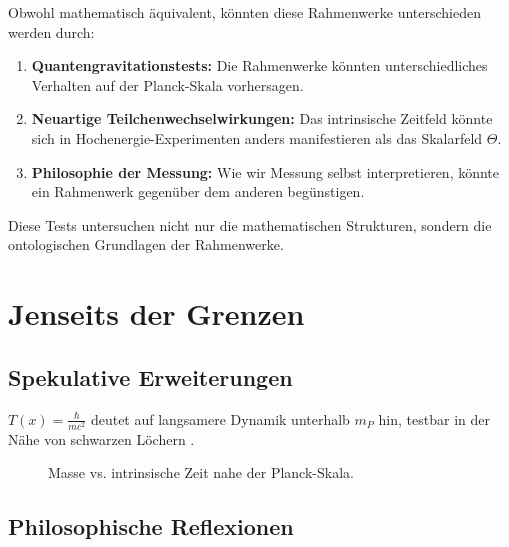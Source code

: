 \documentclass[twocolumn,aps,prl]{revtex4-2}
\newcommand{\Tfield}{T(x)}
\begin{document}
	Obwohl mathematisch äquivalent, könnten diese Rahmenwerke unterschieden werden durch:
	
	\begin{enumerate}
		\item \textbf{Quantengravitationstests:} Die Rahmenwerke könnten unterschiedliches Verhalten auf der Planck-Skala vorhersagen.
		\item \textbf{Neuartige Teilchenwechselwirkungen:} Das intrinsische Zeitfeld könnte sich in Hochenergie-Experimenten anders manifestieren als das Skalarfeld \(\Theta\).
		\item \textbf{Philosophie der Messung:} Wie wir Messung selbst interpretieren, könnte ein Rahmenwerk gegenüber dem anderen begünstigen.
	\end{enumerate}
	
	Diese Tests untersuchen nicht nur die mathematischen Strukturen, sondern die ontologischen Grundlagen der Rahmenwerke.
	
	\section{Jenseits der Grenzen}
	\label{sec:beyond_limits}
	
	\subsection{Spekulative Erweiterungen}
	\label{subsec:speculative_extensions}
	
	\(\Tfield = \frac{\hbar}{m c^2}\) deutet auf langsamere Dynamik unterhalb \(m_P\) hin, testbar in der Nähe von schwarzen Löchern \cite{pascher_planck_2025}.
	
	\begin{figure}[ht]
		\centering
		\caption{Masse vs. intrinsische Zeit nahe der Planck-Skala.}
		\label{fig:mass_time}
	\end{figure}
	
	\subsection{Philosophische Reflexionen}
	\label{subsec:philosophical_reflections}
	
\end{document}
